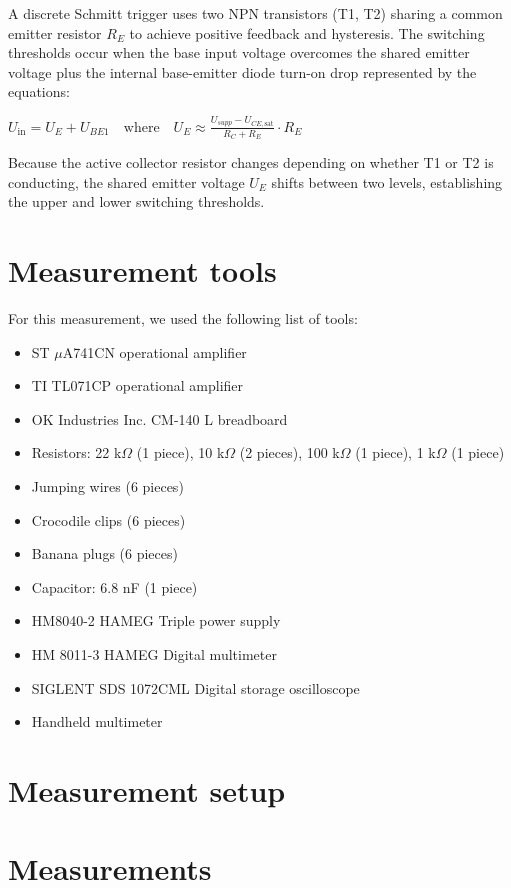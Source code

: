 \documentclass[12pt]{article}
\begin{document}
\vspace{0.3cm}
A discrete Schmitt trigger uses two NPN transistors (T1, T2) sharing a common emitter resistor $R_E$ to achieve positive feedback and hysteresis. The switching thresholds occur when the base input voltage overcomes the shared emitter voltage plus the internal base-emitter diode turn-on drop represented by the equations: 
\begin{center} $U_{\text{in}} = U_E + U_{BE1} \quad \text{where} \quad U_E \approx \frac{U_{supp} - U_{CE,\text{sat}}}{R_C + R_E} \cdot R_E$ \end{center}
Because the active collector resistor changes depending on whether T1 or T2 is conducting, the shared emitter voltage $U_E$ shifts between two levels, establishing the upper and lower switching thresholds.

\section{Measurement tools}
For this measurement, we used the following list of tools:
\begin{itemize}
\item ST $\mu$A741CN operational amplifier
\item TI TL071CP operational amplifier
\item OK Industries Inc. CM-140 L breadboard
\item Resistors: 22 k$\Omega$ (1 piece), 10 k$\Omega$ (2 pieces), 100 k$\Omega$ (1 piece),  1 k$\Omega$ (1 piece)
\item Jumping wires (6 pieces)
\item Crocodile clips (6 pieces)
\item Banana plugs (6 pieces)
\item Capacitor: 6.8 nF (1 piece)
\item HM8040-2 HAMEG Triple power supply
\item HM 8011-3 HAMEG Digital multimeter
\item SIGLENT SDS 1072CML Digital storage oscilloscope
\item Handheld multimeter
\end{itemize}

\newpage \section{Measurement setup}

\pagebreak\section{Measurements}
\end{document}
